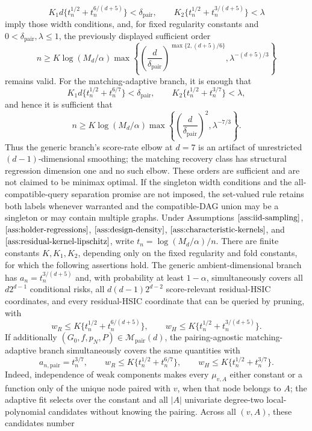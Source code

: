 \[
 K_1d\{t_n^{1/2}+t_n^{6/(d+5)}\}<\delta_{\mathrm{pair}},
 \qquad
 K_2\{t_n^{1/2}+t_n^{3/(d+5)}\}<\lambda
\]
imply those width conditions, and, for fixed regularity constants and \(0<\delta_{\mathrm{pair}},\lambda\le1\), the previously displayed sufficient order
\[
 n\ge K\log(M_d/\alpha)
 \max\left\{
 \left(\frac d{\delta_{\mathrm{pair}}}\right)^{\max\{2,(d+5)/6\}},
 \lambda^{-(d+5)/3}
 \right\}
\]
remains valid. For the matching-adaptive branch, it is enough that
\[
 K_1d\{t_n^{1/2}+t_n^{6/7}\}<\delta_{\mathrm{pair}},
 \qquad
 K_2\{t_n^{1/2}+t_n^{3/7}\}<\lambda,
\]
and hence it is sufficient that
\[
 n\ge K\log(M_d/\alpha)
 \max\left\{
 \left(\frac d{\delta_{\mathrm{pair}}}\right)^2,
 \lambda^{-7/3}
 \right\}.
\]
Thus the generic branch's score-rate elbow at \(d=7\) is an artifact of unrestricted \((d-1)\)-dimensional smoothing; the matching recovery class has structural regression dimension one and no such elbow. These orders are sufficient and are not claimed to be minimax optimal. If the singleton width conditions and the all-compatible-query separation promise are not imposed, the set-valued rule retains both labels whenever warranted and the compatible-DAG union may be a singleton or may contain multiple graphs.
Under Assumptions \(\ref{ass:iid-sampling}\), \(\ref{ass:holder-regressions}\), \(\ref{ass:design-density}\), \(\ref{ass:characteristic-kernels}\), and \(\ref{ass:residual-kernel-lipschitz}\), write \(t_n=\log(M_d/\alpha)/n\). There are finite constants \(K,K_1,K_2\), depending only on the fixed regularity and fold constants, for which the following assertions hold. The generic ambient-dimensional branch has \(a_n=t_n^{3/(d+5)}\) and, with probability at least \(1-\alpha\), simultaneously covers all \(d2^{d-1}\) conditional risks, all \(d(d-1)2^{d-2}\) score-relevant residual-HSIC coordinates, and every residual-HSIC coordinate that can be queried by pruning, with
\[
 w_R\le K\{t_n^{1/2}+t_n^{6/(d+5)}\},
 \qquad
 w_H\le K\{t_n^{1/2}+t_n^{3/(d+5)}\}.
\]
If additionally \((G_0,f,p_N,P)\in\mathcal M_{\mathrm{pair}}(d)\), the pairing-agnostic matching-adaptive branch simultaneously covers the same quantities with
\[
 a_{n,\mathrm{pair}}=t_n^{3/7},
 \qquad
 w_R\le K\{t_n^{1/2}+t_n^{6/7}\},
 \qquad
 w_H\le K\{t_n^{1/2}+t_n^{3/7}\}.
\]
Indeed, independence of weak components makes every \(\mu_{v,A}\) either constant or a function only of the unique node paired with \(v\), when that node belongs to \(A\); the adaptive fit selects over the constant and all \(|A|\) univariate degree-two local-polynomial candidates without knowing the pairing. Across all \((v,A)\), these candidates number
